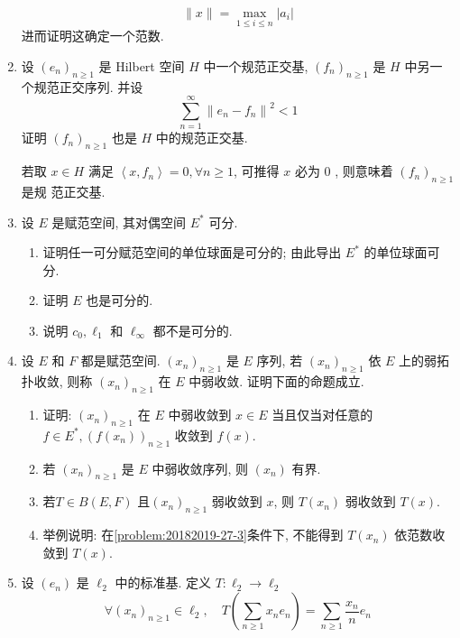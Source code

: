 \begin{enumerate}
\begin{answer}
            \[
                \|x\|=\max_{1\leq i\leq n} |a_i|
            \]
            进而证明这确定一个范数.
        \end{answer}
    \item 设 $\left(e_{n}\right)_{n \geq 1}$ 是 Hilbert 空间 $H$ 中一个规范正交基, $\left(f_{n}\right)_{n \geq 1}$ 是 $H$ 中另一个规范正交序列. 并设
    \[\sum_{n=1}^{\infty}\left\|e_{n}-f_{n}\right\|^{2}<1\] 
    证明 $\left(f_{n}\right)_{n \geq 1}$ 也是 $H$ 中的规范正交基.
    \begin{hint}
        若取 $x \in H$ 满足 $\left\langle x, f_{n}\right\rangle=0, \forall n \geq 1$, 可推得 $x$ 必为 0 , 则意味着 $\left(f_{n}\right)_{n \geq 1}$ 是规 范正交基.
    \end{hint}
    \item 设 $E$ 是赋范空间, 其对偶空间 $E^{*}$ 可分.
        \begin{enumerate}
            \item 证明任一可分赋范空间的单位球面是可分的; 由此导出 $E^{*}$ 的单位球面可分.
            \item 证明 $E$ 也是可分的.
            \item 说明 $c_{0}, \ell_{1}$ 和 $\ell_{\infty}$ 都不是可分的.  
        \end{enumerate}     
    \item 设 $E$ 和 $F$ 都是赋范空间. $\left(x_{n}\right)_{n \geq 1}$ 是 $E$ 序列, 若 $\left(x_{n}\right)_{n \geq 1}$ 依 $E$ 上的弱拓扑收敛, 则称 $\left(x_{n}\right)_{n \geq 1}$ 在 $E$ 中弱收敛. 证明下面的命题成立.
        \begin{enumerate}
            \item 证明: $\left(x_{n}\right)_{n \geq 1}$ 在 $E$ 中弱收敛到 $x \in E$ 当且仅当对任意的 $f \in E^{*},\left(f\left(x_{n}\right)\right)_{n \geq 1}$ 收敛到 $f(x)$.
            \item 若 $\left(x_{n}\right)_{n \geq 1}$ 是 $E$ 中弱收敛序列, 则 $\left(x_{n}\right)$ 有界.
            \item\label{problem:20182019-27-3} 若$T \in B(E, F)$ 且$\left(x_{n}\right)_{n \geq 1}$ 弱收敛到 $x$, 则 $T\left(x_{n}\right)$ 弱收敛到 $T(x)$. 
            \item 举例说明: 在\ref{problem:20182019-27-3}条件下, 不能得到 $T\left(x_{n}\right)$ 依范数收敛到 $T(x)$.
        \end{enumerate}
    \item 设 $\left(e_{n}\right)$ 是 $\ell_{2}$ 中的标准基. 定义 $T: \ell_{2} \rightarrow \ell_{2}$
    \[
    \forall\left(x_{n}\right)_{n \geq 1} \in \ell_{2}, \quad T\left(\sum_{n \geq 1} x_{n} e_{n}\right)=\sum_{n \geq 1} \frac{x_{n}}{n} e_{n}
\]
\end{enumerate}
